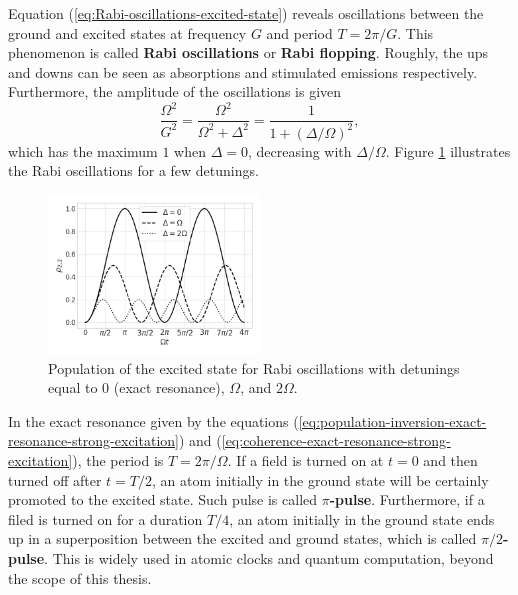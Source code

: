 Equation (\ref{eq:Rabi-oscillations-excited-state}) reveals oscillations between the ground and excited states at frequency $ G $ and period $ T = 2\pi / G $. This phenomenon is called \textbf{Rabi oscillations} or \textbf{Rabi flopping}. Roughly, the ups and downs can be seen as absorptions and stimulated emissions respectively. Furthermore, the amplitude of the oscillations is given
\begin{equation}
	\frac{\Omega^2}{G^2} = \frac{\Omega^2}{\Omega^2 + \Delta^2} = \frac{1}{1 + (\Delta / \Omega)^2},
\end{equation}
which has the maximum $ 1 $ when $ \Delta = 0 $, decreasing with $ \Delta / \Omega $. Figure \ref{fig:Rabi-oscillations} illustrates the Rabi oscillations for a few detunings.

\begin{figure}[!ht]
	\centering
	\includegraphics[width=0.5\textwidth]{USPSC-img/Rabi_oscillations.png}
	\caption{Population of the excited state for Rabi oscillations with detunings equal to $ 0 $ (exact resonance), $ \Omega $, and $ 2\Omega $.}
	\label{fig:Rabi-oscillations}
\end{figure}

In the exact resonance given by the equations (\ref{eq:population-inversion-exact-resonance-strong-excitation}) and (\ref{eq:coherence-exact-resonance-strong-excitation}), the period is $ T = 2\pi / \Omega $. If a field is turned on at $ t = 0 $ and then turned off after $ t = T / 2 $, an atom initially in the ground state will be certainly promoted to the excited state. Such pulse is called \textbf{$\pi$-pulse}. Furthermore, if a filed is turned on for a duration $ T / 4 $, an atom initially in the ground state ends up in a superposition between the excited and ground states, which is called \textbf{$\pi/2$-pulse}. This is widely used in atomic clocks and quantum computation, beyond the scope of this thesis.

